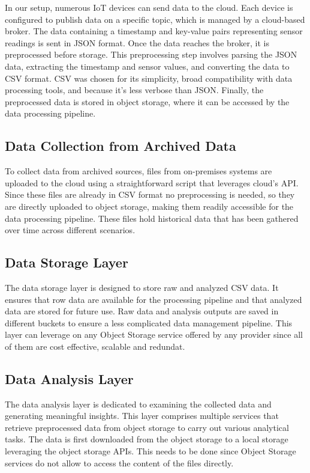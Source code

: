 In our setup, numerous IoT devices can send data to the cloud. Each device is configured to publish data on a specific topic, which is managed by a cloud-based broker. The data containing a timestamp and key-value pairs representing sensor readings is sent in JSON format. Once the data reaches the broker, it is preprocessed before storage. This preprocessing step involves parsing the JSON data, extracting the timestamp and sensor values, and converting the data to CSV format. CSV was chosen for its simplicity, broad compatibility with data processing tools, and because it's less verbose than JSON. Finally, the preprocessed data is stored in object storage, where it can be accessed by the data processing pipeline.


\subsection{Data Collection from Archived Data}
To collect data from archived sources, files from on-premises systems are uploaded to the cloud using a straightforward script that leverages cloud's API. Since these files are already in CSV format no preprocessing is needed, so they are directly uploaded to object storage, making them readily accessible for the data processing pipeline. These files hold historical data that has been gathered over time across different scenarios.

\subsection{Data Storage Layer}

The data storage layer is designed to store raw and analyzed CSV data. It ensures that row data are available for the processing pipeline and that analyzed data are stored for future use. Raw data and analysis outputs are saved in different buckets to ensure a less complicated data management pipeline.
This layer can leverage on any Object Storage service offered by any provider since all of them are cost effective, scalable and redundat. 

\subsection{Data Analysis Layer}

The data analysis layer is dedicated to examining the collected data and generating meaningful insights. This layer comprises multiple services that retrieve preprocessed data from object storage to carry out various analytical tasks. The data is first downloaded from the object storage to a local storage leveraging the object storage APIs. This needs to be done since Object Storage services do not allow to access the content of the files directly.

